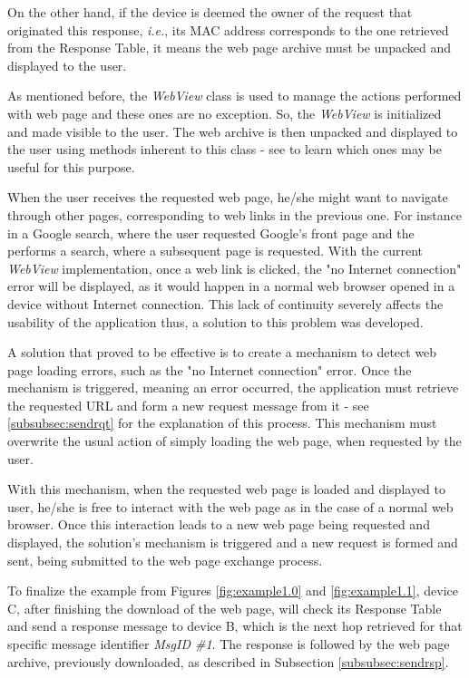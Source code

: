 On the other hand, if the device is deemed the owner of the request that originated this response, \textit{i.e.}, its \gls{MAC} address corresponds to the one retrieved from the Response Table, it means the web page archive must be unpacked and displayed to the user.

As mentioned before, the \textit{WebView} class is used to manage the actions performed with web page and these ones are no exception. So, the \textit{WebView} is initialized and made visible to the user. The web archive is then unpacked and displayed to the user using methods inherent to this class - see \cite{webview} to learn which ones may be useful for this purpose.

When the user receives the requested web page, he/she might want to navigate through other pages, corresponding to web links in the previous one. For instance in a Google search, where the user requested Google's front page and the performs a search, where a subsequent page is requested. With the current \textit{WebView} implementation, once a web link is clicked, the "no Internet connection" error will be displayed, as it would happen in a normal web browser opened in a device without Internet connection. This lack of continuity severely affects the usability of the application thus, a solution to this problem was developed.

A solution that proved to be effective is to create a mechanism to detect web page loading errors, such as the "no Internet connection" error. Once the mechanism is triggered, meaning an error occurred, the application must retrieve the requested \gls{URL} and form a new request message from it - see \ref{subsubsec:sendrqt} for the explanation of this process. This mechanism must overwrite the usual action of simply loading the web page, when requested by the user.

With this mechanism, when the requested web page is loaded and displayed to user, he/she is free to interact with the web page as in the case of a normal web browser. Once this interaction leads to a new web page being requested and displayed, the solution's mechanism is triggered and a new request is formed and sent, being submitted to the web page exchange process.

To finalize the example from Figures \ref{fig:example1.0} and \ref{fig:example1.1}, device C, after finishing the download of the web page, will check its Response Table and send a response message to device B, which is the next hop retrieved for that specific message identifier \textit{MsgID \#1}. The response is followed by the web page archive, previously downloaded, as described in Subsection \ref{subsubsec:sendrsp}.

